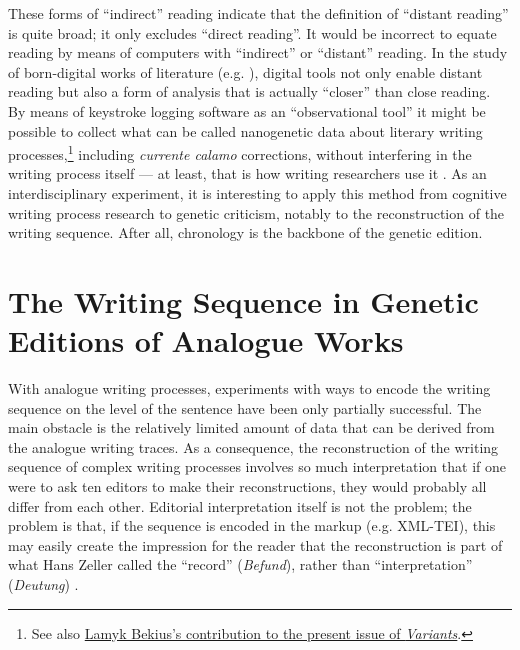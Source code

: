 \begin{paper}
\noindent These forms of ``indirect'' reading indicate that the definition of
``distant reading'' is quite broad; it only excludes ``direct reading''. It
would be incorrect to equate reading by means of computers with
``indirect'' or ``distant'' reading. In the study of born-digital works of
literature (e.g. \citealt{bekius_reconstruction_2020,kirschenbaum_track_2016,ries_rationale_2018,van_hulle_modern_2014,vauthier_genetic_2016}), digital tools not only enable distant reading but
also a form of analysis that is actually ``closer'' than close reading. By
means of keystroke logging software as an ``observational tool'' it
might be possible to collect what can be called nanogenetic data about
literary writing processes,\footnote{See also \hyperref[bekius]{Lamyk Bekius's
  contribution to the present issue of \emph{Variants}}.} including
\emph{currente calamo} corrections, without interfering in the writing
process itself --- at least, that is how writing researchers use it \citep[1]{miller_keystroke_2006}. As an interdisciplinary experiment, it is
interesting to apply this method from cognitive writing process research
to genetic criticism, notably to the reconstruction of the writing
sequence. After all, chronology is the backbone of the genetic edition.

\section*{The Writing Sequence in Genetic Editions of Analogue Works}

With analogue writing processes, experiments with ways to encode the
writing sequence on the level of the sentence have been only partially
successful. The main obstacle is the relatively limited amount of data
that can be derived from the analogue writing traces. As a consequence,
the reconstruction of the writing sequence of complex writing processes
involves so much interpretation that if one were to ask ten editors to
make their reconstructions, they would probably all differ from each
other. Editorial interpretation itself is not the problem; the problem
is that, if the sequence is encoded in the markup (e.g. XML-TEI), this
may easily create the impression for the reader that the reconstruction
is part of what Hans Zeller called the ``record'' (\emph{Befund}),
rather than ``interpretation'' (\emph{Deutung}) \citep{zeller_record_1955}.


\end{paper}
